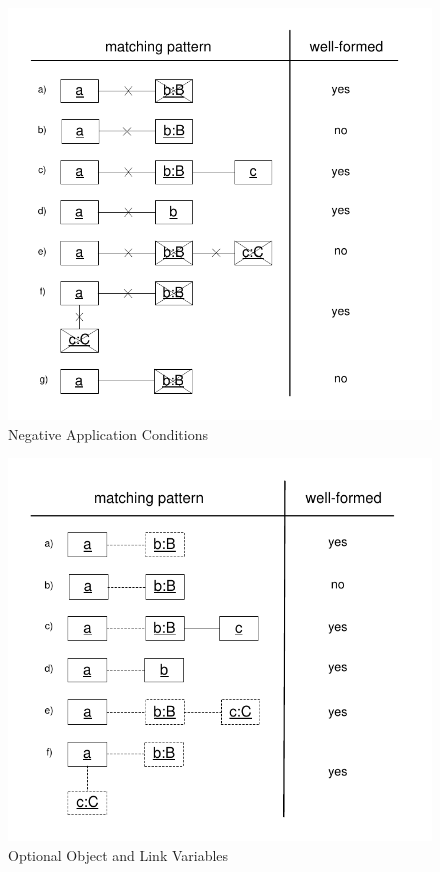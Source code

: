 \begin{figure}[htbp]
  \centering
  \includegraphics[scale=1]{figures/negativeObjects}
  \caption{Negative Application Conditions}
  \label{fig:negativeObjects}
\end{figure}

\begin{figure}[htbp]
  \centering
  \includegraphics[scale=1]{figures/optionalObjects}
  \caption{Optional Object and Link Variables}
  \label{fig:optionalObjects}
\end{figure}

